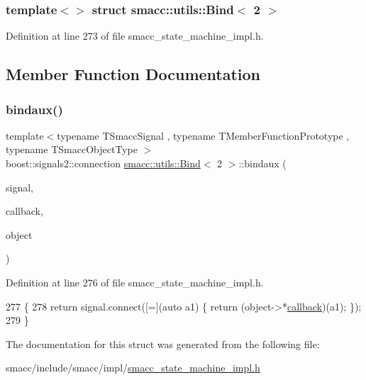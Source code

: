 \subsubsection*{template$<$$>$\newline
struct smacc\+::utils\+::\+Bind$<$ 2 $>$}



Definition at line 273 of file smacc\+\_\+state\+\_\+machine\+\_\+impl.\+h.



\subsection{Member Function Documentation}
\mbox{\label{structsmacc_1_1utils_1_1Bind_3_012_01_4_aa9bba43cc8862f00155b17d2625bd99e}} 
\subsubsection{\texorpdfstring{bindaux()}{bindaux()}}
{\footnotesize\ttfamily template$<$typename T\+Smacc\+Signal , typename T\+Member\+Function\+Prototype , typename T\+Smacc\+Object\+Type $>$ \\
boost\+::signals2\+::connection \hyperlink{structsmacc_1_1utils_1_1Bind}{smacc\+::utils\+::\+Bind}$<$ 2 $>$\+::bindaux (\begin{DoxyParamCaption}\item[{T\+Smacc\+Signal \&}]{signal,  }\item[{T\+Member\+Function\+Prototype}]{callback,  }\item[{T\+Smacc\+Object\+Type $\ast$}]{object }\end{DoxyParamCaption})\hspace{0.3cm}{\ttfamily [inline]}}



Definition at line 276 of file smacc\+\_\+state\+\_\+machine\+\_\+impl.\+h.


\begin{DoxyCode}
277       \{
278         \textcolor{keywordflow}{return} signal.connect([=](\textcolor{keyword}{auto} a1) \{ \textcolor{keywordflow}{return} (object->*\hyperlink{servers_2opencv__perception__node_2opencv__perception__node_8cpp_a050e697bd654facce10ea3f6549669b3}{callback})(a1); \});
279       \}
\end{DoxyCode}


The documentation for this struct was generated from the following file\+:\begin{DoxyCompactItemize}
\item 
smacc/include/smacc/impl/\hyperlink{smacc__state__machine__impl_8h}{smacc\+\_\+state\+\_\+machine\+\_\+impl.\+h}\end{DoxyCompactItemize}
